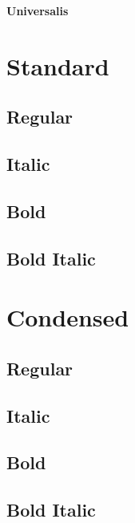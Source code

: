 \documentclass{article}
\begin{document}
\begin{center}\huge\bf Universalis
\end{center}


\section*{Standard}

\subsection*{Regular}
\lipsum[1]

\subsection*{Italic}
\textit{\lipsum[2]}

\subsection*{Bold}

\textbf{\lipsum[3]}

\subsection*{Bold Italic}

\textbf{\textit{\lipsum[4]}}

\section*{Condensed}

\univrscondensed

\subsection*{Regular}
\lipsum[1]

\subsection*{Italic}
\textit{\lipsum[2]}

\subsection*{Bold}

\textbf{\lipsum[3]}

\subsection*{Bold Italic}

\textbf{\textit{\lipsum[4]}}
\end{document}
